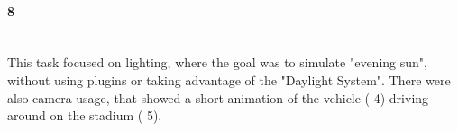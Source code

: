 \paragraph{ 8} ~\\
This task focused on lighting, where the goal was to simulate "evening sun", without using plugins or taking advantage of the "Daylight System".
There were also camera usage, that showed a short animation of the vehicle ( 4) driving around on the stadium ( 5).
